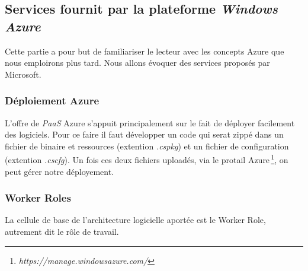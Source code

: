 













%
%



\subsection{Services fournit par la plateforme \textit{Windows Azure}}
Cette partie a pour but de familiariser le lecteur avec les concepts
Azure que nous emploirons plus tard. Nous allons évoquer des services
proposés par Microsoft.\\


\subsubsection{Déploiement Azure}
L'offre de \textit{PaaS} Azure s'appuit principalement sur le fait de
déployer facilement des logiciels. Pour ce faire il faut développer un
code qui serat zippé dans un fichier de binaire et ressources
(extention \textit{.cspkg}) et un fichier de configuration (extention
\textit{.cscfg}). Un fois ces deux fichiers uploadés, via le protail
Azure\,\footnote{\textit{https://manage.windowsazure.com/}}, on peut
gérer notre déployement. \\

\subsubsection{Worker Roles}
La cellule de base de l'architecture logicielle aportée est le Worker
Role, autrement dit le rôle de travail. \\

